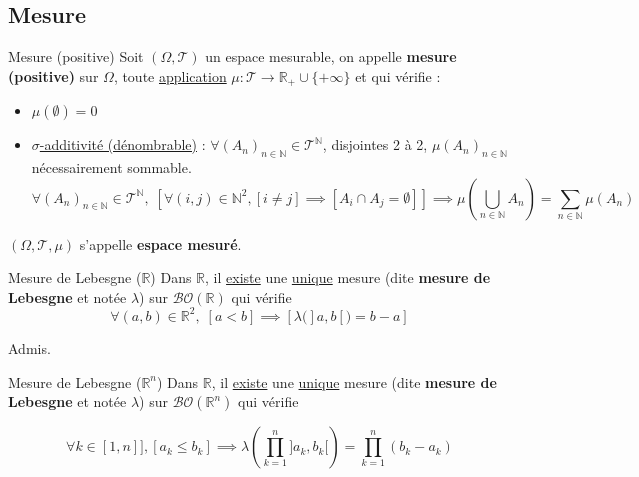 \subsection{Mesure} %
\label{sub:Mesure}

\begin{Definition}[colbacktitle=red!75!black]{Mesure (positive)}{}
  Soit $(\Omega, \mathcal{T})$  un espace mesurable, on appelle \textbf{mesure (positive)} sur $\Omega$, toute \underline{application} $\mu : \mathcal{T} \to \mathbb{R}_+ \cup \{ + \infty\}$ et qui vérifie :
  \begin{itemize}

      \item $\mu(\emptyset) = 0$ 
      \item \underline{$\sigma$-additivité (dénombrable)} : $\forall (A_n) _{n \in \mathbb{N}} \in \mathcal{T} ^{\mathbb{N}}$, disjointes 2 à 2, $\mu(A_n) _{n \in \mathbb{N}}$ nécessairement sommable.
        \begin{equation}
          \forall (A_n) _{n \in \mathbb{N}} \in \mathcal{T} ^{\mathbb{N}}, \; \left[\forall (i,j) \in \mathbb{N} ^{2}, [i \ne j] \implies [A_i \cap A_j = \emptyset]\right] \implies \boxed{\mu \left( \bigcup _{n \in \mathbb{N}} A_n \right) = \sum_{n \in \mathbb{N}}^{} \mu(A_n)}
        \end{equation}

  \end{itemize}

  $(\Omega, \mathcal{T}, \mu)$ s'appelle \textbf{espace mesuré}.
\end{Definition}

\begin{Theorem}{Mesure de Lebesgne ($\mathbb{R}$)}{}
 Dans $\mathbb{R}$, il \underline{existe} une \underline{unique} mesure (dite \textbf{mesure de Lebesgne} et notée $\lambda$) sur $\mathcal{BO}(\mathbb{R})$ qui vérifie
\begin{equation}
  \forall (a,b) \in \mathbb{R} ^{2}, \; [a<b] \implies [\lambda(]a,b[) = b-a]
\end{equation}
\end{Theorem}

\begin{myproof}{}{}
Admis.
\end{myproof}
\begin{Theorem}{Mesure de Lebesgne ($\mathbb{R} ^{n}$)}{}
 Dans $\mathbb{R}$, il \underline{existe} une \underline{unique} mesure (dite \textbf{mesure de Lebesgne} et notée $\lambda$) sur $\mathcal{BO}(\mathbb{R } ^{n})$ qui vérifie

\begin{equation}
  \forall k \in [\!1, n]\!], [a_k \le b_k] \implies \lambda \left( \prod_{k=1}^{n}]a_k, b_k[ \right) = \prod_{k=1}^{n} (b_k - a_k)
\end{equation}
\end{Theorem}

